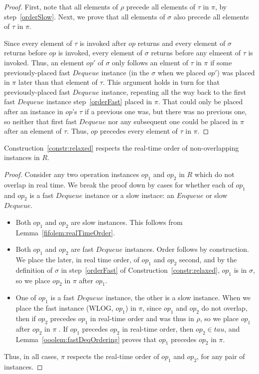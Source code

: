 \documentclass[a4paper,anonymous,USenglish]{lipics-v2021} %
\theoremstyle{definition}
\begin{document}
\begin{proof}
  First, note that all elements of $\rho$ precede all elements of $\tau$ in $\pi$, by step~\ref{orderSlow}.  Next, we prove that all elements of $\sigma$ also precede all elements of $\tau$ in $\pi$.

  Since every element of $\tau$ is invoked after $op$ returns and every element of $\sigma$ returns before $op$ is invoked, every element of $\sigma$ returns before any elmeent of $\tau$ is invoked.  Thus, an element $op'$ of $\sigma$ only follows an elment of $\tau$ in $\pi$ if some previously-placed fast $Dequeue$ instance (in the $\sigma$ when we placed $op'$) was placed in $\pi$ later than that element of $\tau$.  This argument holds in turn for that previously-placed fast $Dequeue$ instance, repeating all the way back to the first fast $Dequeue$ instance step~\ref{orderFast} placed in $\pi$.  That could only be placed after an instance in $op$'s $\tau$ if a previous one was, but there was no previous one, so neither that first fast $Dequeue$ nor any subsequent one could be placed in $\pi$ after an element of $\tau$.  Thus, $op$ precedes every element of $\tau$ in $\pi$.
\end{proof}

\begin{lemma}
  Construction~\ref{constr:relaxed} respects the real-time order of non-overlapping instances in $R$.
\end{lemma}

\begin{proof}
  Consider any two operation instances $op_1$ and $op_2$ in $R$ which do not overlap in real time.  We break the proof down by cases for whether each of $op_1$ and $op_2$ is a fast $Dequeue$ instance or a slow instace: an $Enqueue$ or slow $Dequeue$.
  \begin{itemize}
  \item Both $op_1$ and $op_2$ are slow instances.  This follows from Lemma~\ref{fifolem:realTimeOrder}.
  \item Both $op_1$ and $op_2$ are fast $Dequeue$ instances.  Order follows by construction.  We place the later, in real time order, of $op_1$ and $op_2$ second, and by the definition of $\sigma$ in step~\ref{orderFast} of Construction~\ref{constr:relaxed}, $op_1$ is in $\sigma$, so we place $op_2$ in $\pi$ after $op_1$.
  \item One of $op_1$ is a fast $Dequeue$ instance, the other is a slow instance.  When we place the fast instance (WLOG, $op_1$) in $\pi$, since $op_1$ and $op_2$ do not overlap, then if $op_2$ precedes $op_1$ in real-time order and was thus in $\rho$, so we place $op_1$ after $op_2$ in $\pi$ .  If $op_1$ precedes $op_2$ in real-time order, then $op_2 \in tau$, and Lemma~\ref{ooolem:fastDeqOrdering} proves that $op_1$ precedes $op_2$ in $\pi$.
  \end{itemize}

  Thus, in all cases, $\pi$ respects the real-time order of $op_1$ and $op_2$, for any pair of instances.
\end{proof}
\end{document}
